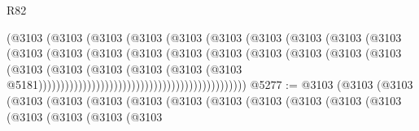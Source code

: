 \begin{lexlean}{R82}
\begin{coremodule}
                                              (@3103
                                                (@3103
                                                  (@3103
                                                    (@3103
                                                      (@3103
                                                        (@3103
                                                          (@3103
                                                            (@3103
                                                              (@3103
                                                                (@3103
                                                                  (@3103
                                                                    (@3103
                                                                      (@3103
                                                                        (@3103
                                                                          (@3103
                                                                            (@3103
                                                                              (@3103
                                                                                (@3103
                                                                                  (@3103
                                                                                    (@3103
                                                                                      (@3103
                                                                                        (@3103
                                                                                          (@3103
                                                                                            (@3103
                                                                                              (@3103
                                                                                                (@3103
                                                                                                  @5181)))))))))))))))))))))))))))))))))))))))))))))))
@5277 := @3103
    (@3103
      (@3103
        (@3103
          (@3103
            (@3103
              (@3103
                (@3103
                  (@3103
                    (@3103
                      (@3103
                        (@3103
                          (@3103
                            (@3103
                              (@3103
                                (@3103
                                  (@3103

\end{coremodule}
\end{lexlean}
